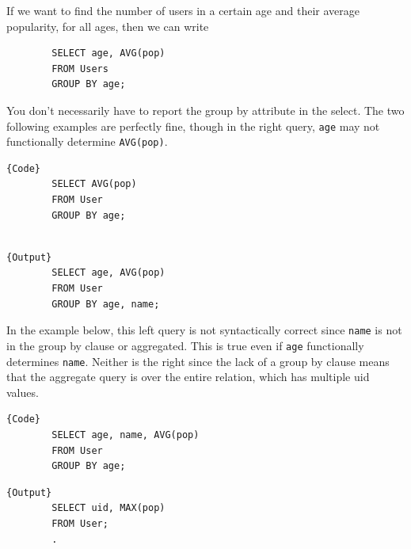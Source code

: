     \begin{example}
      If we want to find the number of users in a certain age and their average popularity, for all ages, then we can write 
      \begin{lstlisting}
        SELECT age, AVG(pop) 
        FROM Users
        GROUP BY age; 
      \end{lstlisting}
      You don't necessarily have to report the group by attribute in the select. The two following examples are perfectly fine, though in the right query, \texttt{age} may not functionally determine \texttt{AVG(pop)}. 

      \noindent\begin{minipage}{.5\textwidth}
      \begin{lstlisting}[]{Code}
        SELECT AVG(pop) 
        FROM User
        GROUP BY age; 
        
      \end{lstlisting}
      \end{minipage}
      \hfill
      \begin{minipage}{.49\textwidth}
      \begin{lstlisting}[]{Output}
        SELECT age, AVG(pop)  
        FROM User 
        GROUP BY age, name; 
      \end{lstlisting}
      \end{minipage}

      In the example below, this left query is not syntactically correct since \texttt{name} is not in the group by clause or aggregated. This is true even if \texttt{age} functionally determines \texttt{name}. Neither is the right since the lack of a group by clause means that the aggregate query is over the entire relation, which has multiple uid values. 

      \noindent\begin{minipage}{.5\textwidth}
      \begin{lstlisting}[]{Code}
        SELECT age, name, AVG(pop) 
        FROM User
        GROUP BY age; 
      \end{lstlisting}
      \end{minipage}
      \hfill
      \begin{minipage}{.49\textwidth}
      \begin{lstlisting}[]{Output}
        SELECT uid, MAX(pop) 
        FROM User; 
        .
      \end{lstlisting}
      \end{minipage}
    \end{example}

